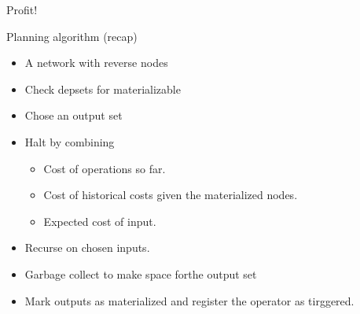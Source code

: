 \begin{frame}{Profit!}
\end{frame}

\begin{frame}{Planning algorithm (recap)}
  \begin{itemize}
  \item A network with reverse nodes
  \item Check depsets for materializable
  \item Chose an output set
  \item Halt by combining
    \begin{itemize}
    \item Cost of operations so far.
    \item Cost of historical costs given the materialized nodes.
    \item Expected cost of input.
    \end{itemize}
  \item Recurse on chosen inputs.
  \item Garbage collect to make space forthe output set
  \item Mark outputs as materialized and register the operator as tirggered.
  \end{itemize}
\end{frame}


